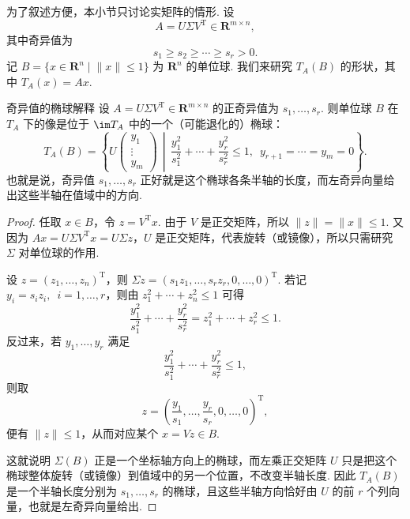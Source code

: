 为了叙述方便，本小节只讨论实矩阵的情形. 设
\[
    A = U\Sigma V^{\mathrm{T}} \in \mathbf{R}^{m \times n},
\]
其中奇异值为
\[
    s_1 \geqslant s_2 \geqslant \cdots \geqslant s_r > 0.
\]
记 $B = \{x \in \mathbf{R}^n \mid \lVert x \rVert \leqslant 1\}$ 为 $\mathbf{R}^n$ 的单位球. 我们来研究 $T_A(B)$ 的形状，其中 $T_A(x) = Ax$.

\begin{theorem}{}{奇异值的椭球解释}
    设 $A = U\Sigma V^{\mathrm{T}} \in \mathbf{R}^{m \times n}$ 的正奇异值为 $s_1, \ldots, s_r$. 则单位球 $B$ 在 $T_A$ 下的像是位于 $\im T_A$ 中的一个（可能退化的）椭球：
    \[
        T_A(B) =
        \left\{
            U
            \begin{pmatrix}
                y_1 \\
                \vdots \\
                y_m
            \end{pmatrix}
            \,\middle|\,
            \frac{y_1^2}{s_1^2} + \cdots + \frac{y_r^2}{s_r^2} \leqslant 1,\enspace
            y_{r+1} = \cdots = y_m = 0
        \right\}.
    \]
    也就是说，奇异值 $s_1, \ldots, s_r$ 正好就是这个椭球各条半轴的长度，而左奇异向量给出这些半轴在值域中的方向.
\end{theorem}

\begin{proof}
    任取 $x \in B$，令 $z = V^{\mathrm{T}}x$. 由于 $V$ 是正交矩阵，所以 $\lVert z \rVert = \lVert x \rVert \leqslant 1$. 又因为 $Ax = U\Sigma V^{\mathrm{T}}x = U\Sigma z$，$U$ 是正交矩阵，代表旋转（或镜像），所以只需研究 $\Sigma$ 对单位球的作用.

    设 $z = (z_1, \ldots, z_n)^{\mathrm{T}}$，则 $\Sigma z = (s_1z_1, \ldots, s_rz_r, 0, \ldots, 0)^{\mathrm{T}}$. 若记 $y_i = s_i z_i,\enspace i = 1, \ldots, r$，则由 $z_1^2 + \cdots + z_n^2 \leqslant 1$ 可得
    \[
        \frac{y_1^2}{s_1^2} + \cdots + \frac{y_r^2}{s_r^2}
        = z_1^2 + \cdots + z_r^2
        \leqslant 1.
    \]
    反过来，若 $y_1, \ldots, y_r$ 满足
    \[
        \frac{y_1^2}{s_1^2} + \cdots + \frac{y_r^2}{s_r^2} \leqslant 1,
    \]
    则取
    \[
        z = \left( \frac{y_1}{s_1}, \ldots, \frac{y_r}{s_r}, 0, \ldots, 0 \right)^{\mathrm{T}},
    \]
    便有 $\lVert z \rVert \leqslant 1$，从而对应某个 $x = Vz \in B$.

    这就说明 $\Sigma(B)$ 正是一个坐标轴方向上的椭球，而左乘正交矩阵 $U$ 只是把这个椭球整体旋转（或镜像）到值域中的另一个位置，不改变半轴长度. 因此 $T_A(B)$ 是一个半轴长度分别为 $s_1, \ldots, s_r$ 的椭球，且这些半轴方向恰好由 $U$ 的前 $r$ 个列向量，也就是左奇异向量给出.
\end{proof}

